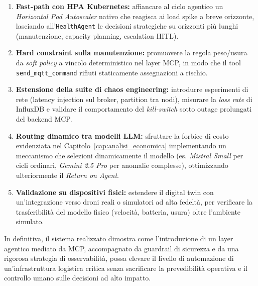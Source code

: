 \begin{enumerate}
    \item \textbf{Fast-path con HPA Kubernetes:} affiancare al ciclo agentico un \textit{Horizontal Pod Autoscaler} nativo che reagisca ai load spike a breve orizzonte, lasciando all'\texttt{HealthAgent} le decisioni strategiche su orizzonti più lunghi (manutenzione, capacity planning, escalation HITL).
    \item \textbf{Hard constraint sulla manutenzione:} promuovere la regola peso/usura da \textit{soft policy} a vincolo deterministico nel layer MCP, in modo che il tool \texttt{send\_mqtt\_command} rifiuti staticamente assegnazioni a rischio.
    \item \textbf{Estensione della suite di chaos engineering:} introdurre esperimenti di rete (latency injection sul broker, partition tra nodi), misurare la \textit{loss rate} di InfluxDB e validare il comportamento del \textit{kill-switch} sotto outage prolungati del backend MCP.
    \item \textbf{Routing dinamico tra modelli LLM:} sfruttare la forbice di costo evidenziata nel Capitolo~\ref{cap:analisi_economica} implementando un meccanismo che selezioni dinamicamente il modello (es. \textit{Mistral Small} per cicli ordinari, \textit{Gemini 2.5 Pro} per anomalie complesse), ottimizzando ulteriormente il \textit{Return on Agent}.
    \item \textbf{Validazione su dispositivi fisici:} estendere il digital twin con un'integrazione verso droni reali o simulatori ad alta fedeltà, per verificare la trasferibilità del modello fisico (velocità, batteria, usura) oltre l'ambiente simulato.
\end{enumerate}

In definitiva, il sistema realizzato dimostra come l'introduzione di un layer agentico mediato da MCP, accompagnato da guardrail di sicurezza e da una rigorosa strategia di osservabilità, possa elevare il livello di automazione di un'infrastruttura logistica critica senza sacrificare la prevedibilità operativa e il controllo umano sulle decisioni ad alto impatto.
